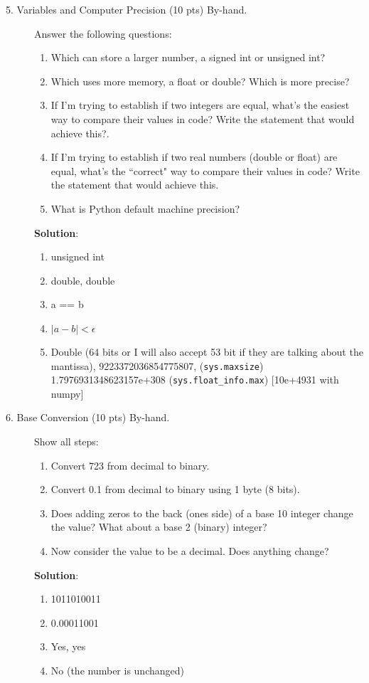 \documentclass[12pt]{article}
\begin{document}
\begin{description}
\item[5. Variables and Computer Precision (10 pts) By-hand.]  Answer the following questions:
	\begin{enumerate}[label=\textbf{(\alph*)}]
		\item Which can store a larger number, a signed int or unsigned int?
		\item Which uses more memory, a float or double? Which is more precise?
		\item If I'm trying to establish if two integers are equal, what's the easiest way to compare their values in code? Write the statement that would achieve this?.
		\item If I'm trying to establish if two real numbers (double or float) are equal, what's the ``correct" way to compare their values in code? Write the statement that would achieve this.
		\item What is Python default machine precision?
	\end{enumerate}
	
	\color{red}
	\ifsolution
	{\bf Solution}:
    \begin{enumerate}[label=\textbf{(\alph*)}]
		\item unsigned int
		\item double, double
		\item a == b
		\item $|a - b| < \epsilon$
		\item Double (64 bits or I will also accept 53 bit if they are talking about the mantissa), 9223372036854775807, (\verb"sys.maxsize") 1.7976931348623157e+308 (\verb"sys.float_info.max") [10e+4931 with numpy]
	\end{enumerate}
	\fi
	\color{black}

\item[6. Base Conversion (10 pts) By-hand.] Show all steps:
\begin{enumerate}[label=\textbf{(\alph*)}]
		\item Convert 723 from decimal to binary.
		\item Convert 0.1 from decimal to binary using 1 byte (8 bits).
		\item Does adding zeros to the back (ones side) of a base 10 integer change the value? What about a base 2 (binary) integer?
		\item Now consider the value to be a decimal. Does anything change?
	\end{enumerate}
	
	\color{red}
	\ifsolution
	{\bf Solution}:
    \begin{enumerate}[label=\textbf{(\alph*)}]
		\item 1011010011
		\item 0.00011001
		\item Yes, yes
		\item No (the number is unchanged)
	\end{enumerate}
	\fi
	\color{black}


\end{description}
\end{document}
